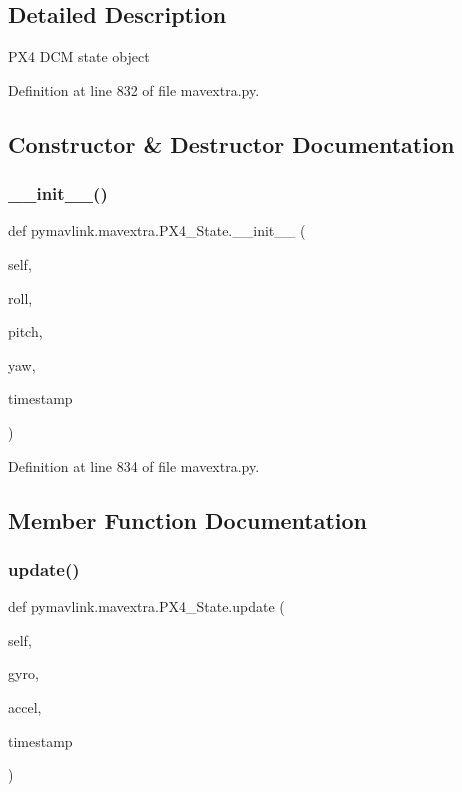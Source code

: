 \subsection{Detailed Description}
\begin{DoxyVerb}PX4 DCM state object\end{DoxyVerb}
 

Definition at line 832 of file mavextra.\+py.



\subsection{Constructor \& Destructor Documentation}
\mbox{\label{classpymavlink_1_1mavextra_1_1PX4__State_a18f7e046f1a106b2174974649f8ec4da}} 
\subsubsection{\texorpdfstring{\_\_init\_\_()}{\_\_init\_\_()}}
{\footnotesize\ttfamily def pymavlink.\+mavextra.\+P\+X4\+\_\+\+State.\+\_\+\+\_\+init\+\_\+\+\_\+ (\begin{DoxyParamCaption}\item[{}]{self,  }\item[{}]{roll,  }\item[{}]{pitch,  }\item[{}]{yaw,  }\item[{}]{timestamp }\end{DoxyParamCaption})}



Definition at line 834 of file mavextra.\+py.



\subsection{Member Function Documentation}
\mbox{\label{classpymavlink_1_1mavextra_1_1PX4__State_a037948aa501815589cc75599fed81b34}} 
\subsubsection{\texorpdfstring{update()}{update()}}
{\footnotesize\ttfamily def pymavlink.\+mavextra.\+P\+X4\+\_\+\+State.\+update (\begin{DoxyParamCaption}\item[{}]{self,  }\item[{}]{gyro,  }\item[{}]{accel,  }\item[{}]{timestamp }\end{DoxyParamCaption})}



